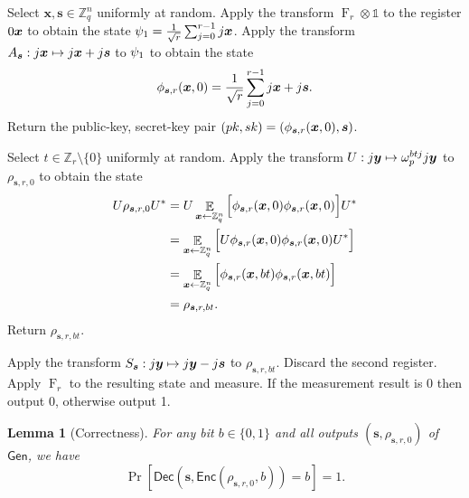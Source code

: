 \documentclass[11pt]{article}
\theoremstyle{plain}
\newtheorem{lemma}[theorem]{Lemma}
\theoremstyle{definition}
\DeclareMathOperator{\qft}{F}
\DeclareMathOperator{\E}{\mathbb{E}}
\let\ket\relax
\DeclarePairedDelimiter{\ket}{\lvert}{\rangle}
\let\bra\relax
\DeclarePairedDelimiter{\bra}{\langle}{\rvert}
\def\Z{\mathbb{Z}}
\def\gen{\mathsf{Gen}}
\def\enc{\mathsf{Enc}}
\def\dec{\mathsf{Dec}}
\begin{document}
\begin{description}[leftmargin = *]
\item [$\gen(1^n)$:] Select $\bm{x}, \bm{s} \in \Z_q^n$ uniformly at random. Apply the transform $\qft_r \otimes \mathds{1}$ to the register $\ket{0} \ket{\bm{x}}$ to obtain the state $\ket{\psi_1} = \frac{1}{\sqrt{r}} \sum_{j = 0}^{r - 1} \ket{j} \ket{\bm{x}}$. Apply the transform $A_{\bm{s}}: \ket{j}\ket{\bm{x}} \mapsto \ket{j}\ket{\bm{x} + j\bm{s}}$ to $\ket{\psi_1}$ to obtain the state
\[ \ket{\phi_{\bm{s}, r}(\bm{x}, 0)} = \frac{1}{\sqrt{r}} \sum_{j = 0}^{r - 1} \ket{j} \ket{\bm{x} + j\bm{s}}. \]
Return the public-key, secret-key pair $(pk, sk) = (\ket{\phi_{\bm{s}, r}(\bm{x}, 0)}, \bm{s})$. 

\item [$\enc(pk = \rho_{\bm{s}, r, 0}, b \in \{ 0, 1 \})$:]  Select $t \in \Z_r {\setminus} \{0\}$ uniformly at random. Apply the transform $U: \ket{j}\ket{\bm{y}} \mapsto \omega_p^{btj}\ket{j}\ket{\bm{y}}$ to $\rho_{\bm{s}, r, 0}$ to obtain the state
\begin{align*}
    U \rho_{\bm{s}, r, 0} U^*
    & = U \E_{\bm{x} \leftarrow \Z_q^n} \Big[ \ket{\phi_{\bm{s}, r}(\bm{x}, 0)} \bra{\phi_{\bm{s}, r}(\bm{x}, 0)} \Big] U^* \\
    & = \E_{\bm{x} \leftarrow \Z_q^n} \Big[ U \ket{\phi_{\bm{s}, r}(\bm{x}, 0)} \bra{\phi_{\bm{s}, r}(\bm{x}, 0)} U^* \Big] \\
    & = \E_{\bm{x} \leftarrow \Z_q^n} \Big[ \ket{\phi_{\bm{s}, r}(\bm{x}, bt)} \bra{\phi_{\bm{s}, r}(\bm{x}, bt)} \Big] \\
    & = \rho_{\bm{s}, r, bt}.
\end{align*}
Return $\rho_{\bm{s}, r, bt}$.

\item [$\dec(sk = \bm{s}, c = \rho_{\bm{s}, r, bt})$:]  Apply the transform $S_{\bm{s}}: \ket{j}\ket{\bm{y}} \mapsto \ket{j}\ket{\bm{y} - j\bm{s}}$ to $\rho_{\bm{s}, r, bt}$. Discard the second register. Apply $\qft_r$ to the resulting state and measure. If the measurement result is 0 then output 0, otherwise output 1. 

\end{description}
\begin{lemma}[Correctness]
    For any bit $b \in \{ 0, 1 \}$ and all outputs $(\bm{s}, \rho_{\bm{s}, r, 0})$ of $\gen$, we have
    \[ \Pr [ \dec(\bm{s}, \enc(\rho_{\bm{s}, r, 0}, b)) = b ] = 1. \]
\end{lemma}
\end{document}
